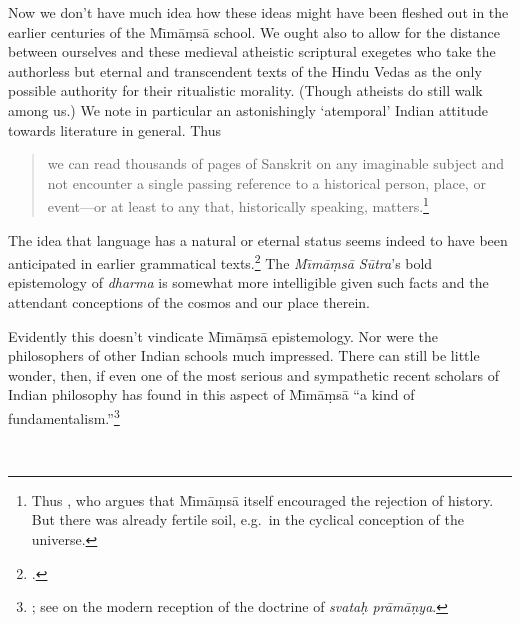 \documentclass[11pt,letterpaper,oneside]{amsart}
\newenvironment{squote}{\begin{quote}\sf\small}{\rm\end{quote}} %
\begin{document}
Now we don't have much idea how these ideas might have been fleshed out in the earlier centuries of the M\={\i}m\=a\d ms\=a school. We ought also to allow for the distance between ourselves and these medieval atheistic scriptural exegetes who take the authorless but eternal and transcendent texts of the Hindu Vedas as the only possible authority for their ritualistic morality. (Though atheists do still walk among us.) We note in particular an astonishingly `atemporal' Indian attitude towards literature in general. Thus \begin{squote}we can read thousands of pages of Sanskrit on any imaginable subject and not encounter a single passing reference to a historical person, place, or event---or at least to any that, historically speaking, matters.\footnote{Thus \citet[p.\ 606]{pollock1989mima}, who argues that M\={\i}m\=a\d ms\=a itself encouraged the rejection of history. But there was already fertile soil, e.g.\ in the cyclical conception of the universe.}\end{squote}The idea that language has a natural or eternal status seems indeed to have been anticipated in earlier grammatical texts.\footnote{\citet{tabereternality}.} The \emph{M\={\i}m\=a\d ms\=a S\=utra}'s bold epistemology of \emph{dharma} is somewhat more intelligible given such facts and the attendant conceptions of the cosmos and our place therein.





Evidently this doesn't vindicate M\={\i}m\=a\d ms\=a epistemology. Nor were the philosophers of other Indian schools much impressed. There can still be little wonder, then, if even one of the most serious and sympathetic recent scholars of Indian philosophy has found in this aspect of M\={\i}m\=a\d ms\=a ``a kind of  fundamentalism.''\footnote{\citet[p.\ 32]{matilal1986perception}; see \citet[pp.\ 589--91]{arnold2001ivr} on the modern reception of the doctrine of \emph{svata\d h pr\=am\=a\d nya}.}

\
\end{document}
